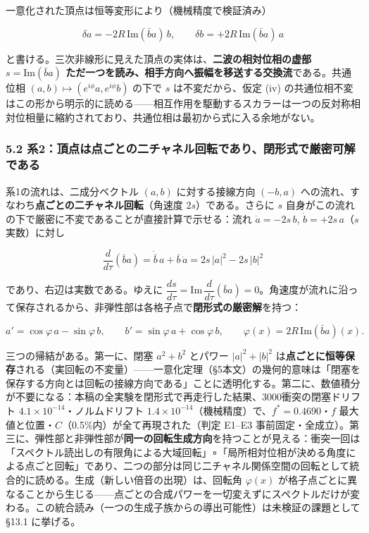 \documentclass[
  a4paper,
]{ltjsarticle}
\begin{document}
一意化された頂点は恒等変形により（機械精度で検証済み）

\[\delta a = -2R\,\mathrm{Im}(\bar b a)\,b, \qquad \delta b = +2R\,\mathrm{Im}(\bar b a)\,a\]

と書ける。三次非線形に見えた頂点の実体は、\textbf{二波の相対位相の虚部
\(s=\mathrm{Im}(\bar b a)\)
ただ一つを読み、相手方向へ振幅を移送する交換流}である。共通位相
\((a,b)\mapsto(e^{i\phi}a, e^{i\phi}b)\) の下で \(s\) は不変だから、仮定
(iv)
の共通位相不変はこの形から明示的に読める------相互作用を駆動するスカラーは一つの反対称相対位相量に縮約されており、共通位相は最初から式に入る余地がない。

\subsubsection{5.2
系2：頂点は点ごとの二チャネル回転であり、閉形式で厳密可解である}\label{ux7cfb2ux9802ux70b9ux306fux70b9ux3054ux3068ux306eux4e8cux30c1ux30e3ux30cdux30ebux56deux8ee2ux3067ux3042ux308aux9589ux5f62ux5f0fux3067ux53b3ux5bc6ux53efux89e3ux3067ux3042ux308b}

系1の流れは、二成分ベクトル \((a,b)\) に対する接線方向 \((-b, a)\)
への流れ、すなわち\textbf{点ごとの二チャネル回転}（角速度
\(2s\)）である。さらに \(s\)
自身がこの流れの下で厳密に不変であることが直接計算で示せる：流れ
\(\dot a = -2s\,b\), \(\dot b = +2s\,a\)（\(s\) 実数）に対し

\[\frac{d}{d\tau}(\bar b a) = \dot{\bar b}\,a + \bar b\,\dot a = 2s\,|a|^2 - 2s\,|b|^2\]

であり、右辺は実数である。ゆえに
\(\dfrac{ds}{d\tau} = \mathrm{Im}\,\dfrac{d}{d\tau}(\bar b a) = 0\)。角速度が流れに沿って保存されるから、非弾性部は各格子点で\textbf{閉形式の厳密解}を持つ：

\[a' = \cos\varphi\,a - \sin\varphi\,b, \qquad b' = \sin\varphi\,a + \cos\varphi\,b, \qquad \varphi(x) = 2R\,\mathrm{Im}(\bar b a)(x).\]

三つの帰結がある。第一に、閉塞 \(a^2+b^2\) とパワー \(|a|^2+|b|^2\)
は\textbf{点ごとに恒等保存}される（実回転の不変量）------一意化定理（§5本文）の幾何的意味は「閉塞を保存する方向とは回転の接線方向である」ことに透明化する。第二に、数値積分が不要になる：本稿の全実験を閉形式で再走行した結果、3000衝突の閉塞ドリフト
\(4.1\times10^{-14}\)・ノルムドリフト
\(1.4\times10^{-14}\)（機械精度）で、\(f^*=0.4690\)・\(f\)
最大値と位置・\(C\)（0.5\%内）が全て再現された（判定 E1--E3
事前固定・全成立）。第三に、弾性部と非弾性部が\textbf{同一の回転生成方向}を持つことが見える：衝突一回は「スペクトル読出しの有限角による大域回転」∘「局所相対位相が決める角度による点ごと回転」であり、二つの部分は同じ二チャネル関係空間の回転として統合的に読める。生成（新しい倍音の出現）は、回転角
\(\varphi(x)\)
が格子点ごとに異なることから生じる------点ごとの合成パワーを一切変えずにスペクトルだけが変わる。この統合読み（一つの生成子族からの導出可能性）は未検証の課題として
§13.1 に挙げる。
\end{document}
